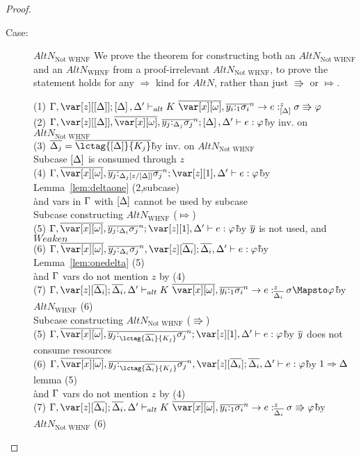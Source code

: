 \begin{proof}
\begin{description}
\item[Case:] $AltN_{\textrm{Not WHNF}}$
    We prove the theorem for constructing both an $AltN_{\textrm{Not WHNF}}$
        and an $AltN_{\textrm{WHNF}}$ from a proof-irrelevant $AltN_{\textrm{Not
        WHNF}}$, to prove the statement holds for any $\Rightarrow$ kind for
        $AltN$, rather than just $\Rrightarrow$ or $\Mapsto$.
\begin{tabbing}
    (1) $\G, \z[\irr{\D}]; \irr{\D}, \D' \vdash_{alt} K~\ov{\xo},\ov{y_i{:}_{1}\s_i}^n\to e :^z_{\irr{\D}} \s \Rrightarrow \vp$\\
    (2) $\G,\z[\irr{\D}],\ov{\xo},\ov{y_j{:}_{\D_j}\s_j}^n; \irr{\D}, \D' \vdash e : \vp$\`by inv. on $AltN_{\textrm{Not WHNF}}$\\
    (3) $\ov{\D_j} = \ov{\lctag{\irr{\D}}{K_j}}$\`by inv. on $AltN_{\textrm{Not WHNF}}$\\
    Subcase $\left[\Delta\right]$ is consumed through $z$\\
    (4) $\G,\ov{\xo},\ov{y_j{:}_{\D_j[z/\irr{\D}]}\s_j}^n; \z[1], \D' \vdash e : \vp$\`by Lemma~\ref{lem:deltaone} (2,subcase)\\\`and vars in $\Gamma$ with $\left[\Delta\right]$ cannot be used by subcase\\
    Subcase constructing $AltN_{\textrm{WHNF}}$ ($\Mapsto$)\\
    (5) $\G,\ov{\xo},\ov{y_j{:}_{\D_i}\s_j}^n; \z[1], \D' \vdash e : \vp$\`by $\overline{y}$ is not used, and $Weaken$\\
    (6) $\G,\ov{\xo},\ov{y_j{:}_{\D_i}\s_j}^n, \z[\ov{\D_i}]; \ov{\D_i}, \D' \vdash e : \vp$\`by Lemma~\ref{lem:onedelta} (5)\\\` and $\Gamma$ vars do not mention $z$ by (4) \\
    (7) $\G, \z[\ov{\D_i}]; \ov{\D_i}, \D' \vdash_{alt} K~\ov{\xo},\ov{y_i{:}_{1}\s_i}^n \to e :^z_{\ov{\D_i}} \s \Mapsto \vp$\`by $AltN_{\textrm{WHNF}}$ (6)\\
    Subcase constructing $AltN_{\textrm{Not WHNF}}$ ($\Rrightarrow$)\\
    (5) $\G,\ov{\xo},\ov{y_j{:}_{\lctag{\ov{\D_i}}{K_j}}\s_j}^n; \z[1], \D' \vdash e : \vp$\`by $\overline{y}$ does not consume resources\\
    (6) $\G,\ov{\xo},\ov{y_j{:}_{\lctag{\ov{\D_i}}{K_j}}\s_j}^n, \z[\ov{\D_i}]; \ov{\D_i}, \D' \vdash e : \vp$\`by $1 \Rightarrow \Delta$ lemma (5)\\\` and $\Gamma$ vars do not mention $z$ by (4) \\
    (7) $\G, \z[\ov{\D_i}]; \ov{\D_i}, \D' \vdash_{alt} K~\ov{\xo},\ov{y_i{:}_{1}\s_i}^n \to e :^z_{\ov{\D_i}} \s \Rrightarrow \vp$\`by $AltN_{\textrm{Not WHNF}}$ (6)\\

\end{tabbing}
\end{description}
\end{proof}
